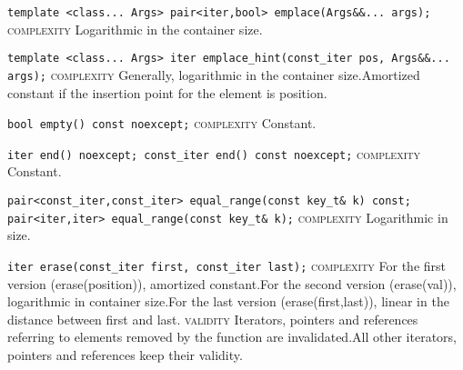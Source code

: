 \noindent{}\hspace*{0.25em}\lstinline[basicstyle=\ttfamily\color{clime}]{template <class... Args> pair<iter,bool> emplace(Args&&... args);} \textsc{complexity} Logarithmic in the container size.\\\vspace{-0.6em}

\noindent{}\hspace*{0.25em}\lstinline[basicstyle=\ttfamily\color{clime}]{template <class... Args> iter emplace_hint(const_iter pos, Args&&... args);} \textsc{complexity} Generally, logarithmic in the container size.Amortized constant if the insertion point for the element is position.\\\vspace{-0.6em}

\noindent{}\hspace*{0.25em}\lstinline[basicstyle=\ttfamily\color{cgreen}]{bool empty() const noexcept;} \textsc{complexity} Constant.\\\vspace{-0.6em}

\noindent{}\hspace*{0.25em}\lstinline[basicstyle=\ttfamily\color{cgreen}]{iter end() noexcept; const_iter end() const noexcept;} \textsc{complexity} Constant.\\\vspace{-0.6em}

\noindent{}\hspace*{0.25em}\lstinline[basicstyle=\ttfamily\color{clime}]{pair<const_iter,const_iter> equal_range(const key_t& k) const; pair<iter,iter> equal_range(const key_t& k);} \textsc{complexity} Logarithmic in size.\\\vspace{-0.6em}

\noindent{}\hspace*{0.25em}\lstinline[basicstyle=\ttfamily\color{corange}]{iter erase(const_iter first, const_iter last);} \textsc{complexity} For the first version (erase(position)), amortized constant.For the second version (erase(val)), logarithmic in container size.For the last version (erase(first,last)), linear in the distance between first and last. \textsc{validity} Iterators, pointers and references referring to elements removed by the function are invalidated.All other iterators, pointers and references keep their validity.\\\vspace{-0.6em}

